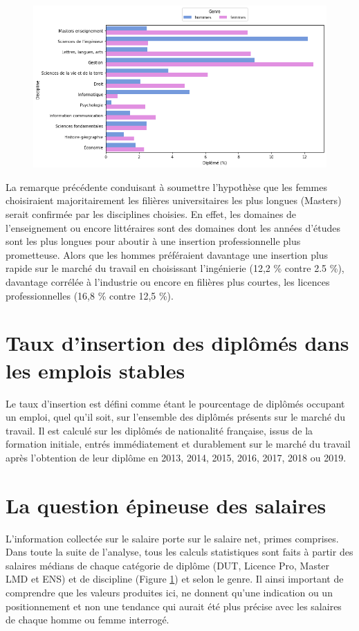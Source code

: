 \documentclass[12pt, a4paper, titlepage, table]{article}
\begin{document}
	\begin{figure}[H]
		\centering
		\includegraphics[width=1\textwidth]{../graphs/proportion_disciplines.png}
		\label{fig:genre_discipline}
	\end{figure}

	La remarque précédente conduisant à soumettre l'hypothèse que les femmes choisiraient majoritairement les filières universitaires les plus longues (Masters) serait confirmée par les disciplines choisies.
	En effet, les domaines de l'enseignement ou encore littéraires sont des domaines dont les années d'études sont les plus longues pour aboutir à une insertion professionnelle plus prometteuse.
	Alors que les hommes préféraient davantage une insertion plus rapide sur le marché du travail en choisissant l'ingénierie (12,2 \% contre 2.5 \%), davantage corrélée à l'industrie ou encore en filières plus courtes, les licences professionnelles (16,8 \% contre 12,5 \%). 

\section{Taux d'insertion des diplômés dans les emplois stables}

Le taux d’insertion est défini comme étant le pourcentage de diplômés occupant un emploi, quel qu’il soit, sur l’ensemble des diplômés présents sur le marché du travail. Il est calculé sur les diplômés de nationalité française, issus de la formation initiale, entrés immédiatement et durablement sur le marché du travail après l’obtention de leur diplôme en 2013, 2014, 2015, 2016, 2017, 2018 ou 2019.


\section{La question épineuse des salaires}
L’information collectée sur le salaire porte sur le salaire net, primes comprises. Dans toute la suite de l'analyse, tous les calculs statistiques sont faits à partir des salaires médians de chaque catégorie de diplôme (DUT, Licence Pro, Master LMD et ENS) et de discipline (Figure \ref{fig:genre_discipline}) et selon le genre. Il ainsi important de comprendre que les valeurs produites ici,  ne donnent qu'une indication ou un positionnement et non une tendance qui aurait été plus précise avec les salaires de chaque homme ou femme interrogé.
 
\end{document}
